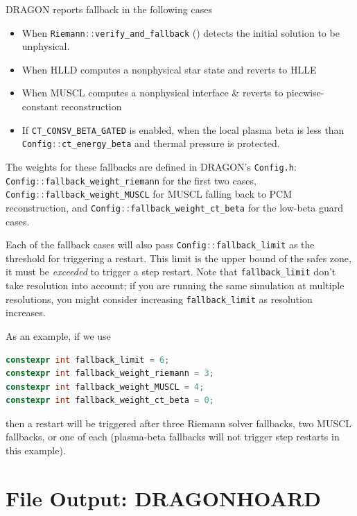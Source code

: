 \documentclass[11pt]{report}
\newcommand{\cpp}[1]{\lstinline[language=C++]{#1}}
\newcommand{\bash}[1]{\lstinline[language=bash]{#1}}
\begin{document}
DRAGON reports fallback in the following cases
\begin{itemize}
\item When \cpp{Riemann::verify_and_fallback} () detects the initial solution to be unphysical.
\item When HLLD computes a nonphysical star state and reverts to HLLE
\item When MUSCL computes a nonphysical interface \& reverts to piecwise-constant reconstruction
\item If \cpp{CT_CONSV_BETA_GATED} is enabled, when the local plasma beta is less than \cpp{Config::ct_energy_beta} and thermal pressure is protected.

\end{itemize}
The weights for these fallbacks are defined in DRAGON's \bash{Config.h}: \cpp{Config::fallback_weight_riemann} for the first two cases, \cpp{Config::fallback_weight_MUSCL} for MUSCL falling back to PCM reconstruction,  and \cpp{Config::fallback_weight_ct_beta} for the low-beta guard cases.

Each of the fallback cases will also pass \cpp{Config::fallback_limit} as the threshold for triggering a restart. This limit is the upper bound of the safes zone, it must be \textit{exceeded} to trigger a step restart.
 Note that \cpp{fallback_limit}  don't take resolution into account; if you are running the same simulation at multiple resolutions, you might consider increasing \cpp{fallback_limit} as resolution increases.


As an example, if we use
\begin{lstlisting}[language=C++]
constexpr int fallback_limit = 6;
constexpr int fallback_weight_riemann = 3;
constexpr int fallback_weight_MUSCL = 4;
constexpr int fallback_weight_ct_beta = 0;
\end{lstlisting}
then a restart will be triggered after three Riemann solver fallbacks, two MUSCL fallbacks, or one of each (plasma-beta fallbacks will not trigger step restarts in this example).



\chapter{File Output: DRAGONHOARD}
\label{ch:hoard}
\end{document}
